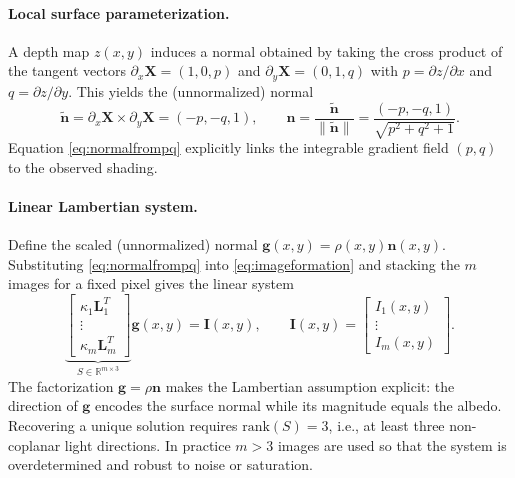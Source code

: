 \documentclass[11pt]{article}
\begin{document}
\paragraph{Local surface parameterization.} A depth map $z(x,y)$ induces a normal obtained by taking the cross product of the tangent vectors $\partial_x \mathbf{X}=(1,0,p)$ and $\partial_y \mathbf{X}=(0,1,q)$ with $p = \partial z/\partial x$ and $q = \partial z/\partial y$. This yields the (unnormalized) normal
\begin{equation}
\tilde{\mathbf{n}} = \partial_x \mathbf{X} \times \partial_y \mathbf{X} = (-p, -q, 1), \qquad 
\mathbf{n} = \frac{\tilde{\mathbf{n}}}{\|\tilde{\mathbf{n}}\|} = \frac{(-p,-q,1)}{\sqrt{p^2+q^2+1}}.
\label{eq:normalfrompq}
\end{equation}
Equation \eqref{eq:normalfrompq} explicitly links the integrable gradient field $(p,q)$ to the observed shading.

\paragraph{Linear Lambertian system.} Define the scaled (unnormalized) normal $\mathbf{g}(x,y)=\rho(x,y)\mathbf{n}(x,y)$. Substituting \eqref{eq:normalfrompq} into \eqref{eq:imageformation} and stacking the $m$ images for a fixed pixel gives the linear system
\begin{equation}
\underbrace{\begin{bmatrix}
\kappa_1 \mathbf{L}_1^T \\
\vdots \\
\kappa_m \mathbf{L}_m^T
\end{bmatrix}}_{S \in \mathbb{R}^{m\times 3}} 
\mathbf{g}(x,y) = \mathbf{I}(x,y), \qquad \mathbf{I}(x,y) = \begin{bmatrix}I_1(x,y) \\ \vdots \\ I_m(x,y)\end{bmatrix}.
\label{eq:pslinear}
\end{equation}
The factorization $\mathbf{g} = \rho\mathbf{n}$ makes the Lambertian assumption explicit: the direction of $\mathbf{g}$ encodes the surface normal while its magnitude equals the albedo. Recovering a unique solution requires $\text{rank}(S)=3$, i.e., at least three non-coplanar light directions. In practice $m>3$ images are used so that the system is overdetermined and robust to noise or saturation.
\end{document}
